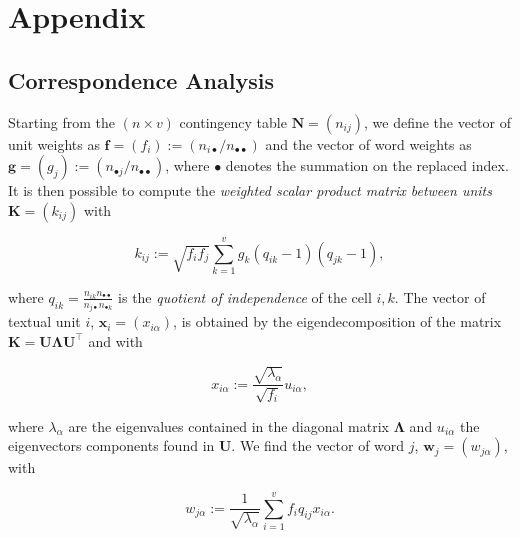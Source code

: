 \documentclass[
twocolumn,
]{ceurart}
\begin{document}
\appendix

\section{Appendix}

\subsection{Correspondence Analysis}
\label{ca_details}

Starting from the $(n \times v)$ contingency table $\mathbf{N} = (n_{ij})$, we define the vector of unit weights as $\mathbf{f} = (f_i) := (n_{i\bullet}/n_{\bullet \bullet})$ and the vector of word weights as $\mathbf{g} = (g_j) := (n_{\bullet j}/n_{\bullet \bullet})$, where $\bullet$ denotes the summation on the replaced index. It is then possible to compute the \emph{weighted scalar product matrix between units} $\mathbf{K} = (k_{ij})$ with

\begin{equation}
k_{ij} := \sqrt{f_i f_j} \sum_{k=1}^{v} g_k(q_{ik} - 1)(q_{jk} - 1), 
\end{equation}

where $q_{ik} = \frac{n_{ik} n_{\bullet \bullet}}{n_{j \bullet} n_{\bullet k}}$ is the \emph{quotient of independence} of the cell $i, k$. The vector of textual unit $i$, $\mathbf{x}_i = (x_{i\alpha})$, is obtained by the eigendecomposition of the matrix $\mathbf{K} = \mathbf{U}\bm{\Lambda}\mathbf{U}^\top$ and with

\begin{equation}
x_{i\alpha} := \frac{\sqrt{\lambda_\alpha}}{\sqrt{f_i}} u_{i \alpha},
\end{equation}

where $\lambda_\alpha$ are the eigenvalues contained in the diagonal matrix $\bm{\Lambda}$ and $u_{i \alpha}$ the eigenvectors components found in $\mathbf{U}$. We find the vector of word $j$, $\mathbf{w}_j = (w_{j\alpha})$, with 

\begin{equation}
w_{j\alpha} := \frac{1}{\sqrt{\lambda_\alpha}} \sum_{i=1}^v f_i q_{ij} x_{i \alpha}.
\end{equation}
\end{document}
